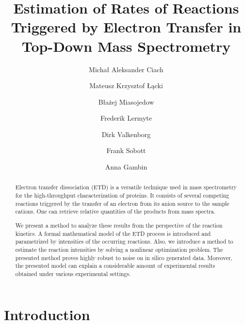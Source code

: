 \documentclass{llncs}
\begin{document}
\pagestyle{plain}
\title{Estimation of Rates of Reactions Triggered by Electron Transfer in Top-Down Mass Spectrometry}
\author{Michał Aleksander Ciach \and Mateusz Krzysztof Łącki \and Błażej Miasojedow \and Frederik Lermyte \and Dirk Valkenborg \and Frank Sobott \and Anna Gambin }






\maketitle
\begin{abstract}
Electron transfer dissociation (ETD) is a versatile technique used in mass spectrometry for the high-throughput characterization of proteins. It consists of several competing reactions triggered by the transfer of an electron from its anion source to the sample cations. One can retrieve relative quantities of the products from mass spectra.

We present a method to analyze these results from the perspective of the reaction kinetics. A formal mathematical model of the ETD process is introduced and parametrized by intensities of the occurring reactions. Also, we introduce a method to estimate the reaction intensities by solving a nonlinear optimization problem. The presented method proves highly robust to noise on in silico generated data. Moreover, the presented model can explain a considerable amount of experimental results obtained under various experimental settings.
\end{abstract}

\section{Introduction}
\end{document}
